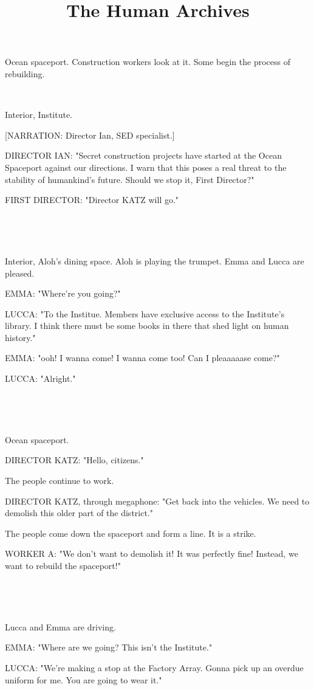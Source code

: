 \documentclass[11pt]{article}
\begin{document}
\ttfamily
\title{The Human Archives}
\maketitle

Ocean spaceport.
Construction workers look at it.
Some begin the process of rebuilding.

\ 

Interior, Institute.

[NARRATION: Director Ian, SED specialist.]

DIRECTOR IAN: "Secret construction projects have started at the Ocean Spaceport against our directions. 
I warn that this poses a real threat to the stability of humankind's future.
Should we stop it, First Director?"

FIRST DIRECTOR: "Director KATZ will go."

\ 

\ 

Interior, Aloh's dining space.
Aloh is playing the trumpet.
Emma and Lucca are pleased.

EMMA: "Where're you going?"

LUCCA: "To the Institue.
Members have exclusive access to the Institute's library.
I think there must be some books in there that shed light on human history."

EMMA: "ooh! I wanna come! I wanna come too! Can I pleaaaaase come?"

LUCCA: "Alright."

\ 

\ 

Ocean spaceport.

DIRECTOR KATZ: "Hello, citizens."

The people continue to work.

DIRECTOR KATZ, through megaphone: "Get back into the vehicles.
We need to demolish this older part of the district."

The people come down the spaceport and form a line.
It is a strike.

WORKER A: "We don't want to demolish it! It was perfectly fine!
Instead, we want to rebuild the spaceport!"

\ 

\ 

Lucca and Emma are driving.

EMMA: "Where are we going? This isn't the Institute."

LUCCA: "We're making a stop at the Factory Array.
Gonna pick up an overdue uniform for me.
You are going to wear it."
\end{document}

